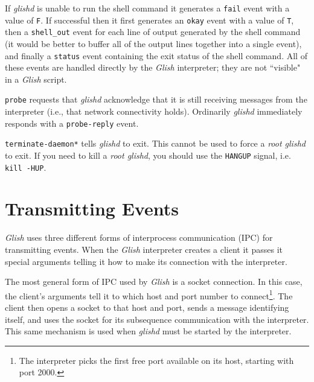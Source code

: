 \begin{sloppy}
\begin{list}{}{}
If {\em glishd} is unable to run the shell command it generates a
{\tt fail} event with a value of {\tt F}.  If successful then it
first generates an {\tt okay} event with a value of {\tt T}, then
a {\tt shell\_out} event for each line of output generated by
the shell command (it would be better to buffer all of the output lines
together into a single event),
and finally a {\tt status} event containing the exit status of the
shell command.  All of these events are handled directly by the
{\em Glish} interpreter; they are not ``visible" in a {\em Glish} script.

\item[{\tt probe}] requests
that {\em glishd} acknowledge that it is still receiving messages
from the interpreter (i.e., that network connectivity holds).  Ordinarily
{\em glishd} immediately responds with a {\tt probe-reply} event.

\item[{\tt *terminate-daemon*}] tells
{\em glishd} to exit. This cannot be used to force a {\em root glishd} to exit.
If you need to kill a {\em root glishd}, you should use the {\tt HANGUP}
signal, i.e. \verb+kill -HUP+.

\end{list}


\section{Transmitting Events}

{\em Glish} uses three different forms of interprocess communication (IPC) for
transmitting events.  When the {\em Glish} interpreter creates a client it passes it 
special arguments telling it how to make its connection with the interpreter.

The most general form of IPC used by {\em Glish} is a socket connection.
In this case, the client's arguments tell it to which host and port number
to connect\footnote{The interpreter picks the first free port available
on its host, starting with port 2000.}.  The client then opens a socket
to that host and port, sends a message identifying itself, and uses the
socket for its subsequence communication with the interpreter. This same
mechanism is used when {\em glishd} must be started by the interpreter.


\end{sloppy}
